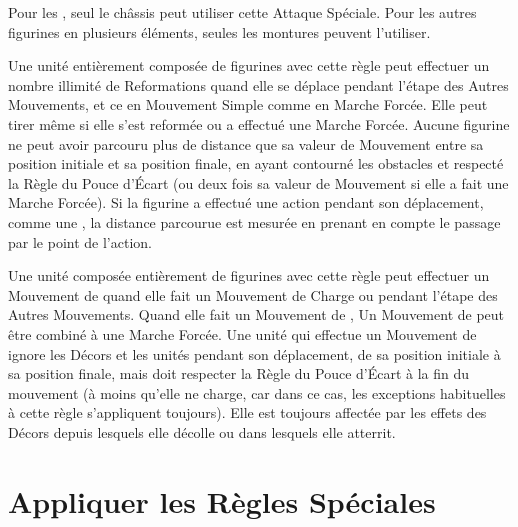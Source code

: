 Pour les \chariots{}, seul le châssis peut utiliser cette Attaque Spéciale. Pour les autres figurines en plusieurs éléments, seules les montures peuvent l'utiliser.

\newpage
{}

Une unité entièrement composée de figurines avec cette règle peut effectuer un nombre illimité de Reformations quand elle se déplace pendant l'étape des Autres Mouvements, et ce en Mouvement Simple comme en Marche Forcée. Elle peut tirer même si elle s'est reformée ou a effectué une Marche Forcée. Aucune figurine ne peut avoir parcouru plus de distance que sa valeur de Mouvement entre sa position initiale et sa position finale, en ayant contourné les obstacles et respecté la Règle du Pouce d'Écart (ou deux fois sa valeur de Mouvement si elle a fait une Marche Forcée). Si la figurine a effectué une action pendant son déplacement, comme une \sweepingattack{}, la distance parcourue est mesurée en prenant en compte le passage par le point de l'action. 


 Une unité composée entièrement de figurines avec cette règle peut effectuer un Mouvement de \fly{} quand elle fait un Mouvement de Charge ou pendant l'étape des Autres Mouvements. Quand elle fait un Mouvement de \fly{},  Un Mouvement de \fly{} peut être combiné à une Marche Forcée. Une unité qui effectue un Mouvement de \fly{} ignore les Décors et les unités pendant son déplacement, de sa position initiale à sa position finale, mais doit respecter la Règle du Pouce d'Écart à la fin du mouvement (à moins qu'elle ne charge, car dans ce cas, les exceptions habituelles à cette règle s'appliquent toujours). Elle est toujours affectée par les effets des Décors depuis lesquels elle décolle ou dans lesquels elle atterrit.

\newpage
\section{Appliquer les Règles Spéciales}


